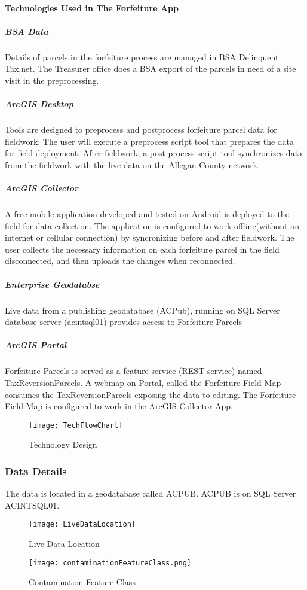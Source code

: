  \paragraph{Technologies Used in The Forfeiture App}
 \begin{adjmulticols}{2}{\innerMar}{\outerMar}
 \subparagraph{BSA Data}
 \noindent Details of parcels in the forfeiture process are managed in BSA Delinquent Tax.net.  The Treasurer office does a BSA export of the parcels in need of a site visit in the preprocessing.
 \subparagraph{ArcGIS Desktop}\noindent Tools are designed to preprocess and postprocess forfeiture parcel data for fieldwork.  The user will execute a preprocess script tool that prepares the data for field deployment.  After fieldwork, a post process script tool synchronizes data from the fieldwork with the live data on the Allegan County network.
 \subparagraph{ArcGIS Collector}\noindent A free mobile application developed and tested on Android is deployed to the field for data collection.  The application is configured to work offline(without an internet or cellular connection) by syncronizing before and after fieldwork. The user collects the necessary information on each forfeiture parcel in the field disconnected, and then uploads the changes when reconnected.
 \subparagraph{Enterprise Geodatabse}\noindent Live data from a publishing geodatabase (ACPub), running on SQL Server database server (acintsql01) provides access to Forfeiture Parcels
 \subparagraph{ArcGIS Portal} \noindent Forfeiture Parcels is served as a feature service (REST service)  named TaxReversionParcels.  A webmap on Portal, called the Forfeiture Field Map consumes the TaxReversionParcels exposing the data to editing.  The Forfeiture Field Map is configured to work in the ArcGIS Collector App.
 \end{adjmulticols}
 \begin{figure}[H]
 \centering
     \texttt{[image: TechFlowChart]}
 \vspace{-.2in}

 \caption{Technology Design}
 \end{figure}
 \clearpage
 \subsubsection[Data Details]{Data Details\texorpdfstring{\\}{}}
 \noindent The data is located in a geodatabase called ACPUB.  ACPUB is on SQL Server ACINTSQL01.
 \begin{wrapfigure}{r}{0.6\textwidth}
 \centering
     \texttt{[image: LiveDataLocation]}
 \caption{Live Data Location}
 \vspace{.1in}

 \HRule
 \vspace{.2in}

     \texttt{[image: contaminationFeatureClass.png]}
 \caption{Contamination Feature Class}
 \end{wrapfigure}
 \vspace{1in}

